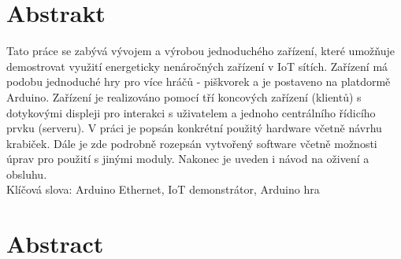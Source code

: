 \section*{Abstrakt}
Tato práce se zabývá vývojem a výrobou jednoduchého zařízení, které umožňuje demostrovat využití energeticky nenáročných zařízení v IoT sítích. Zařízení má podobu jednoduché hry pro více hráčů - piškvorek a je postaveno na platdormě Arduino. Zařízení je realizováno pomocí tří koncových zařízení (klientů) s dotykovými displeji pro interakci s uživatelem a jednoho centrálního řídicího prvku (serveru). V práci je popsán konkrétní použitý hardware včetně návrhu krabiček. Dále je zde podrobně rozepsán vytvořený software včetně možnosti úprav pro použití s jinými moduly. Nakonec je uveden i návod na oživení a obsluhu.\\

\vspace{.5cm}
\noindent
Klíčová slova: Arduino Ethernet, IoT demonstrátor, Arduino hra



\section*{Abstract}
\notFinished
